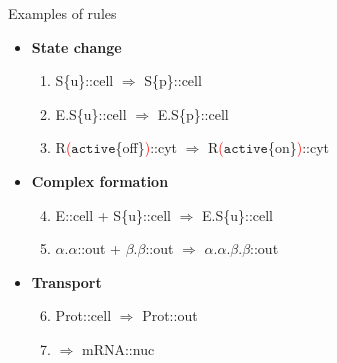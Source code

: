 \documentclass[10pt]{beamer}
\begin{document}
\begin{frame}[fragile]{Examples of rules}

\begin{itemize}

\item \textbf{State change}

\begin{enumerate}

\item S\{\textcolor{mygreen}{u}\}::cell $\Rightarrow$ S\{\textcolor{mygreen}{p}\}::cell

\item E.S\{\textcolor{mygreen}{u}\}::cell $\Rightarrow$ E.S\{\textcolor{mygreen}{p}\}::cell

\item R\textcolor{red}{(}$\mathtt{active}$\{\textcolor{mygreen}{off}\}\textcolor{red}{)}::cyt $\Rightarrow$ R\textcolor{red}{(}$\mathtt{active}$\{\textcolor{mygreen}{on}\}\textcolor{red}{)}::cyt

\end{enumerate}

\item \textbf{Complex formation}

\begin{enumerate}
\setcounter{enumi}{3}

\item E::cell + S\{\textcolor{mygreen}{u}\}::cell $\Rightarrow$ E.S\{\textcolor{mygreen}{u}\}::cell

\item $\alpha.\alpha$::out + $\beta.\beta$::out $\Rightarrow$ $\alpha.\alpha.\beta.\beta$::out

\end{enumerate}

\item \textbf{Transport}

\begin{enumerate}
\setcounter{enumi}{5}

\item Prot::cell $\Rightarrow$ Prot::out

\item $\Rightarrow$ mRNA::nuc

\end{enumerate}

\end{itemize}

\end{frame}

\end{document}
